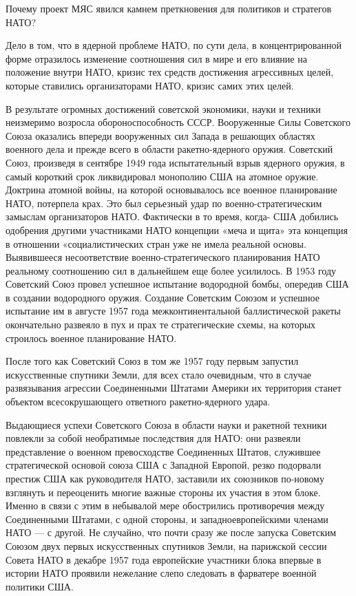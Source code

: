 \documentclass[12pt, a4paper, openany]{book}
\begin{document}
		
		Почему проект МЯС явился камнем преткновения для политиков и стратегов НАТО?
		
		Дело в том, что в ядерной проблеме НАТО, по сути дела, в концентрированной форме отразилось изменение соотношения сил в мире и его влияние на положение внутри НАТО, кризис тех средств достижения агрессивных целей, которые ставились организаторами НАТО, кризис самих этих целей.
		
		В результате огромных достижений советской экономики, науки и техники неизмеримо возросла обороноспособность СССР. Вооруженные Силы Советского Союза оказались впереди вооруженных сил Запада в решающих областях военного дела и прежде всего в области ракетно-ядерного оружия. Советский Союз, произведя в сентябре 1949 года испытательный взрыв ядерного оружия, в самый короткий срок ликвидировал монополию США на атомное оружие. Доктрина атомной войны, на которой основывалось все военное планирование НАТО, потерпела крах. Это был серьезный удар по военно-стратегическим замыслам организаторов НАТО. Фактически в то время, когда- США добились одобрения другими участниками НАТО концепции «меча и щита» эта концепция в отношении «социалистических стран уже не имела реальной основы. Выявившееся несоответствие военно-стратегического планирования НАТО реальному соотношению сил в дальнейшем еще более усилилось. В 1953 году Советский Союз провел успешное испытание водородной бомбы, опередив США в создании водородного оружия. Создание Советским Союзом и успешное испытание им в августе 1957 года межконтинентальной баллистической ракеты окончательно развеяло в пух и прах те стратегические схемы, на которых строилось военное планирование НАТО.
		
		После того как Советский Союз в том же 1957 году первым запустил искусственные спутники Земли, для всех стало очевидным, что в случае развязывания агрессии Соединенными Штатами Америки их территория станет объектом всесокрушающего ответного ракетно-ядерного удара.
		
		Выдающиеся успехи Советского Союза в области науки и ракетной техники повлекли за собой необратимые последствия для НАТО: они развеяли представление о военном превосходстве Соединенных Штатов, служившее стратегической основой союза США с Западной Европой, резко подорвали престиж США как руководителя НАТО, заставили их союзников по-новому взглянуть и переоценить многие важные стороны их участия в этом блоке. Именно в связи с этим в небывалой мере обострились противоречия между Соединенными Штатами, с одной стороны, и западноевропейскими членами НАТО — с другой. Не случайно, что почти сразу же после запуска Советским Союзом двух первых искусственных спутников Земли, на парижской сессии Совета НАТО в декабре 1957 года европейские участники блока впервые в истории НАТО проявили нежелание слепо следовать в фарватере военной политики США.
		
\end{document}
